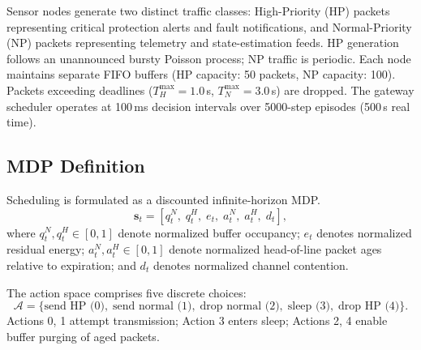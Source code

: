 \documentclass[runningheads,a4paper]{llncs}
\begin{document}
Sensor nodes generate two distinct traffic classes: High-Priority (HP) packets representing critical protection alerts and fault notifications, and Normal-Priority (NP) packets representing telemetry and state-estimation feeds. HP generation follows an unannounced bursty Poisson process; NP traffic is periodic. Each node maintains separate FIFO buffers (HP capacity: 50 packets, NP capacity: 100). Packets exceeding deadlines ($T_H^{\text{max}} = 1.0$\,s, $T_N^{\text{max}} = 3.0$\,s) are dropped. The gateway scheduler operates at 100\,ms decision intervals over 5000-step episodes (500\,s real time).

\subsection{MDP Definition}
Scheduling is formulated as a discounted infinite-horizon MDP.
\begin{equation}
\mathbf{s}_t = \left[ q_t^{N},\; q_t^{H},\; e_t,\; a_t^{N},\; a_t^{H},\; d_t \right],
\end{equation}
where $q_t^{N}, q_t^{H} \in [0,1]$ denote normalized buffer occupancy; $e_t$ denotes normalized residual energy; $a_t^{N}, a_t^{H} \in [0,1]$ denote normalized head-of-line packet ages relative to expiration; and $d_t$ denotes normalized channel contention.

The action space comprises five discrete choices:
\begin{equation}
\mathcal{A} = \{\text{send HP (0)},\; \text{send normal (1)},\; \text{drop normal (2)},\; \text{sleep (3)},\; \text{drop HP (4)}\}.
\end{equation}
Actions 0, 1 attempt transmission; Action 3 enters sleep; Actions 2, 4 enable buffer purging of aged packets.
\end{document}
